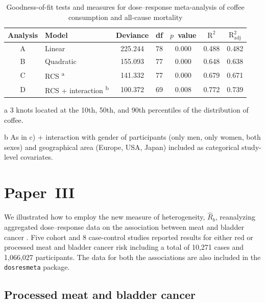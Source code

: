 \documentclass[11pt,a4paper,twoside,openany]{book}\usepackage{knitr}
\begin{document}
{{\begin{table}[!h]

\begin{threeparttable}
\caption{\label{tab:gof_tab}Goodness-of-fit tests and measures for dose--response meta-analysis of coffee consumption and all-cause mortality \citep{crippa2014coffee}}
\centering
\begin{tabular}[t]{c>{\centering\arraybackslash}p{5.8cm}ccccc}
\toprule
Analysis & Model & Deviance & df & $p$~value & \textrm{$\mathrm{R^2}$} & \textrm{$\mathrm{R_{\textrm{adj}}^2}$}\\
\midrule
A & Linear & 225.244 & 78 & 0.000 & 0.488 & 0.482\\
B & Quadratic & 155.093 & 77 & 0.000 & 0.648 & 0.638\\
C & RCS \textsuperscript{a} & 141.332 & 77 & 0.000 & 0.679 & 0.671\\
D & RCS + interaction \textsuperscript{b} & 100.372 & 69 & 0.008 & 0.772 & 0.739\\
\bottomrule
\end{tabular}
\begin{tablenotes}
\small
\item[a] 3 knots located at the 10th, 50th, and 90th percentiles of the distribution of coffee.
\item[b] As in c) + interaction with gender of participants (only men, only women, both sexes) and geographical area (Europe, USA, Japan) included as categorical study-level covariates.
\end{tablenotes}
\end{threeparttable}
\end{table}




\section{Paper~III}\label{sec:res_paperIII}



We illustrated how to employ the new measure of heterogeneity, $\hat R_b$, reanalyzing aggregated dose--response data on the association between meat and bladder cancer \citep{crippa2016red}. Five cohort and 8 case-control studies reported results for either red or processed meat and bladder cancer risk including a total of 10,271 cases and 1,066,027 participants. The data for both the associations are also included in the \texttt{dosresmeta} package.

\subsection{Processed meat and bladder cancer}

}}
\end{document}
